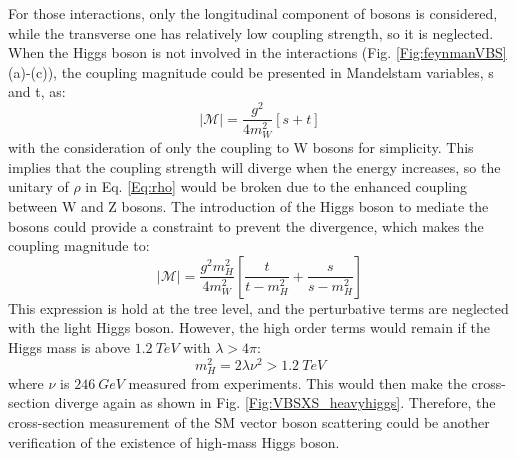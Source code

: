 \noindent
For those interactions, only the longitudinal component of bosons is considered, while the transverse one has relatively low coupling strength, so it is neglected\cite{Brass:2018hfw}. When the Higgs boson is not involved in the interactions (Fig. \ref{Fig:feynmanVBS} (a)-(c)), the coupling magnitude\cite{Barger:1990py} could be presented in Mandelstam variables, s and t, as:
\begin{equation}
|\mathcal{M}|=\frac{g^2}{4m_{W}^{2}}\left[s+t\right]
\end{equation}
with the consideration of only the coupling to W bosons for simplicity. This implies that the coupling strength will diverge when the energy increases, so the unitary of $\rho$ in Eq. \ref{Eq:rho} would be broken due to the enhanced coupling between W and Z bosons. The introduction of the Higgs boson to mediate the bosons could provide a constraint to prevent the divergence, which makes the coupling magnitude to:
\begin{equation}
|\mathcal{M}|=\frac{g^2m_{H}^2}{4m_{W}^{2}}\left[\frac{t}{t-m_{H}^{2}}+\frac{s}{s-m_{H}^{2}}\right]
\end{equation} 
This expression is hold at the tree level, and the perturbative terms are neglected with the light Higgs boson\cite{Rindani:2009gm}. However, the high order terms would remain if the Higgs mass is above $1.2~TeV$ with $\lambda > 4\pi$:
\begin{equation}
m^2_{H}=2\lambda\nu^2 > 1.2~TeV
\end{equation}
where $\nu$ is $246~GeV$ measured from experiments. This would then make the cross-section diverge again as shown in Fig. \ref{Fig:VBSXS_heavyhiggs}. Therefore, the cross-section measurement of the SM vector boson scattering could be another verification of the existence of high-mass Higgs boson.  

